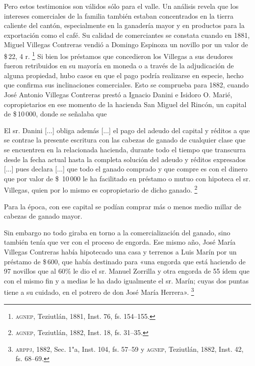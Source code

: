 \documentclass[14pt,twoside,final]{extbook} %
\let\oldfootnote\footnote
\renewcommand\footnote[1]{%
\oldfootnote{\hspace{1mm}#1}}
\begin{document}
Pero estos testimonios son válidos sólo para el valle. Un análisis revela que los intereses comerciales de la familia también estaban concentrados en la tierra caliente del cantón, especialmente en la ganadería mayor y en productos para la exportación como el café. Su calidad de comerciantes se constata cuando en 1881, Miguel Villegas Contreras vendió a Domingo Espinoza un novillo por un valor de \$\,22, 4 r.\footnote{\textsc{agnep}, Teziutlán, 1881, Inst. 76, fs. 154--155.} Si bien los préstamos que concedieron los Villegas a sus deudores fueron retribuidos en su mayoría en moneda o a través de la adjudicación de alguna propiedad, hubo casos en que el pago podría realizarse en especie, hecho que confirma sus inclinaciones comerciales. Esto se comprueba para 1882, cuando José Antonio Villegas Contreras prestó a Ignacio Danini e Isidoro O. Marié, copropietarios en ese momento de la hacienda San Miguel del Rincón, un capital de \$\,10\,000, donde se señalaba que
\begin{quoting}
El sr. Danini [...] obliga además [...] el pago del adeudo del capital y réditos a que se contrae la presente escritura con las cabezas de ganado de cualquier clase que se encuentren en la relacionada hacienda, durante todo el tiempo que transcurra desde la fecha actual hasta la completa solución del adeudo y réditos expresados [...] pues declara [...] que todo el ganado comprado y que compre es con el dinero que por valor de \$~10\,000 le ha facilitado en préstamo o mutuo con hipoteca el sr. Villegas, quien por lo mismo es copropietario de dicho ganado.\footnote{\textsc{agnep}, Teziutlán, 1882, Inst. 18, fs. 31--35.}
\end{quoting}
Para la época, con ese capital se podían comprar más o menos medio millar de cabezas de ganado mayor.

Sin embargo no todo giraba en torno a la comercialización del ganado, sino también tenía que ver con el proceso de engorda. Ese mismo año, José María Villegas Contreras había hipotecado una casa y terrenos a Luis Marín por un préstamo de \$\,600, que había destinado para «una engorda que está haciendo de 97 novillos que al 60\% le dio el sr. Manuel Zorrilla y otra engorda de 55 ídem que con el mismo fin y a medias le ha dado igualmente el sr. Marín; cuyas dos puntas tiene a su cuidado, en el potrero de don José María Herrera».\footnote{\textsc{arppj}, 1882, Sec. 1"a, Inst. 104, fs. 57--59 y \textsc{agnep}, Teziutlán, 1882, Inst. 42, fs. 68--69.}
\end{document}
